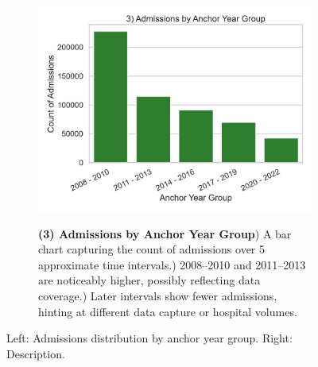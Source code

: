\begin{figure}[ht!]
    \centering
    \begin{subfigure}{0.42\textwidth}
        \includegraphics[width=\linewidth]{mimic_plots/plot3.jpg}
    \end{subfigure}\hfill
    \begin{subfigure}{0.54\textwidth}
        \footnotesize
        \textbf{(3) Admissions by Anchor Year Group}) A bar chart capturing the count of admissions over 5 approximate time intervals.) 2008--2010 and 2011--2013 are noticeably higher, possibly reflecting data coverage.) Later intervals show fewer admissions, hinting at different data capture or hospital volumes.
    \end{subfigure}
    \caption{Left: Admissions distribution by anchor year group. Right: Description.}
    \label{fig:plot3}
\end{figure}

